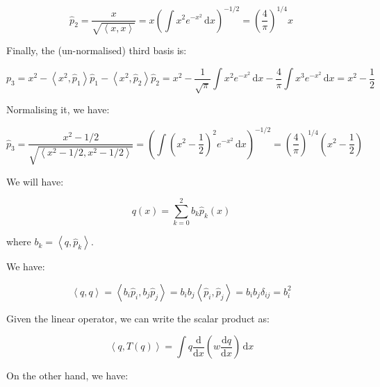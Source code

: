 \documentclass[12pt]{article}
\begin{document}
\begin{equation}
    \hat{p}_{2} = \frac{x}{\sqrt{\left\langle x, x \right\rangle}} = x \left( \int x^{2} e^{-x^{2}} \, \mathrm{d}x \right)^{-1/2} = \left( \frac{4}{\pi} \right)^{1/4} x
\end{equation}

Finally, the (un-normalised) third basis is:

\begin{equation}
    p_{3} = x^{2} - \left\langle x^{2}, \hat{p}_{1} \right\rangle \hat{p}_{1} - \left\langle x^{2}, \hat{p}_{2} \right\rangle \hat{p}_{2} = x^{2} - \frac{1}{\sqrt{\pi}} \int x^{2} e^{-x^{2}} \, \mathrm{d}x - \frac{4}{\pi} \int x^{3} e^{-x^{2}} \, \mathrm{d}x = x^{2} - \frac{1}{2}
\end{equation}

Normalising it, we have:

\begin{equation}
    \hat{p}_{3} = \frac{x^{2} - 1/2}{\sqrt{\left\langle x^{2} - 1/2, x^{2} - 1/2 \right\rangle}} = \left( \int \left( x^{2} - \frac{1}{2} \right)^{2} e^{-x^{2}} \, \mathrm{d}x \right)^{-1/2} = \left( \frac{4}{\pi} \right)^{1/4} \left( x^{2} - \frac{1}{2} \right)
\end{equation}

We will have:

\begin{equation}
    q(x) = \sum_{k=0}^{2} b_{k} \hat{p}_{k}(x)
\end{equation}

where $b_{k} = \left\langle q, \hat{p}_{k} \right\rangle$.

We have:

\begin{equation}
    \left\langle q, q \right\rangle =  \left\langle b_{i} \hat{p}_{i}, b_{j} \hat{p}_{j} \right\rangle = b_{i} b_{j} \left\langle \hat{p}_{i}, \hat{p}_{j} \right\rangle = b_{i} b_{j} \delta_{ij} = b_{i}^{2}
\end{equation}

Given the linear operator, we can write the scalar product as:

\begin{equation}
    \left\langle q, T(q) \right\rangle = \int q \frac{\mathrm{d}}{\mathrm{d}x} \left( w \frac{\mathrm{d}q}{\mathrm{d}x} \right) \, \mathrm{d}x
\end{equation}

On the other hand, we have:
\end{document}
